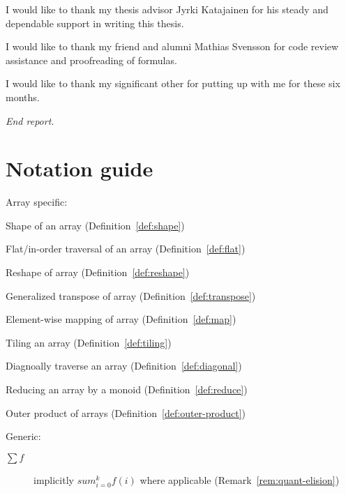 \documentclass{DIKU-report-variant}
\newcommand\mrm[1]{\mathrm{#1}}
\newcommand\brm[1]{\bm{\mrm{#1}}}
\newcommand\reduce{\operatorname*{\brm{reduce}\,}}
\newcommand\diag{\operatorname*{\brm{diag}\,}}
\newcommand\tile{\operatorname*{\brm{tile}\,}}
\newcommand\oprodby[1]{\mathop{\operatorname*{\,\brm{by}}_{#1}}}
\begin{document}
I would like to thank my thesis advisor Jyrki Katajainen for his steady and dependable
support in writing this thesis.

I would like to thank my friend and alumni Mathias Svensson for code review assistance and
proofreading of formulas.

I would like to thank my significant other for putting up with me for these six months.

\clearpage
{}
{}
\printbibliography

\vfill
\begin{center}\itshape End report.\end{center}
\clearpage

\appendix
\renewcommand\thesection{\Alph{section}}
{}


\section{Notation guide}

Array specific:
\begin{description}[align=left,labelwidth=7em]
  \item[\(\sharp A\)] Shape of an array (Definition~\ref{def:shape})
  \item[\(\flat A\)] Flat/in-order traversal of an array (Definition~\ref{def:flat})
  \item[\(\varrho(A, \rho)\)] Reshape of array (Definition~\ref{def:reshape})
  \item[\(A \circ \sigma\)] Generalized transpose of array (Definition~\ref{def:transpose})
  \item[\(f \circ A\)] Element-wise mapping of array (Definition~\ref{def:map})
  \item[\(\tile_{\times k, x} A\)] Tiling an array (Definition~\ref{def:tiling})
  \item[\(\diag_{x, y} A\)] Diagnoally traverse an array (Definition~\ref{def:diagonal})
  \item[\(\reduce^k_{(S, \oplus, \epsilon)} A\)] Reducing an array by a monoid (Definition~\ref{def:reduce})
  \item[\(A \oprodby f B\)] Outer product of arrays (Definition~\ref{def:outer-product})
\end{description}

Generic:
\begin{description}
  \item[\(\sum f\)] implicitly \(sum_{i=0}^{k} f(i)\) where applicable (Remark~\ref{rem:quant-elision})
\end{description}
\end{document}
